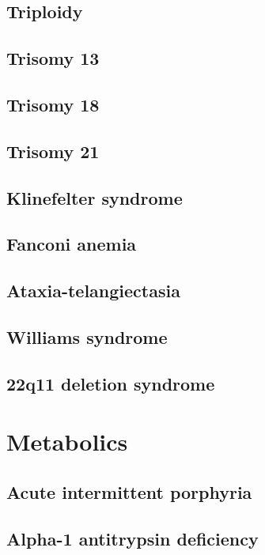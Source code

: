 \documentclass{scrartcl}
\begin{document}
\subsection{Triploidy}
\label{sec:orgb232411}
\subsection{Trisomy 13}
\label{sec:org01da597}
\subsection{Trisomy 18}
\label{sec:orgf94f8c7}
\subsection{Trisomy 21}
\label{sec:org0b6c610}
\subsection{Klinefelter syndrome}
\label{sec:org8f1efaf}
\subsection{Fanconi anemia}
\label{sec:org36112eb}
\subsection{Ataxia-telangiectasia}
\label{sec:org8d8099f}
\subsection{Williams syndrome}
\label{sec:org8ec765e}
\subsection{22q11 deletion syndrome}
\label{sec:orge3d4425}

\section{Metabolics}
\label{sec:org8e00701}
\subsection{Acute intermittent porphyria}
\label{sec:org2dd885f}

\subsection{Alpha-1 antitrypsin deficiency}
\label{sec:org44f2e63}
\end{document}
